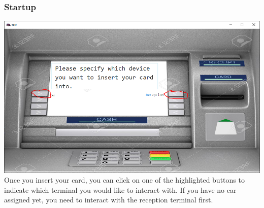 \documentclass[a4paper]{article}
\begin{document}
\subsubsection{Startup}
\includegraphics[width=\textwidth]{startup.PNG}
Once you insert your card, you can click on one of the highlighted buttons to indicate which terminal you would like to interact with. If you have no car assigned yet, you need to interact with the reception terminal first.
\end{document}
